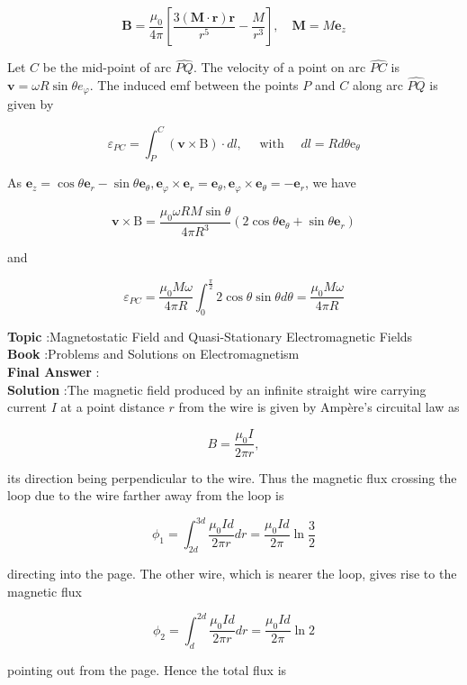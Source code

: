 \documentclass[10pt]{article}
\begin{document}
$$
\mathbf{B}=\frac{\mu_{0}}{4 \pi}\left[\frac{3(\mathbf{M} \cdot \mathbf{r}) \mathbf{r}}{r^{5}}-\frac{M}{r^{3}}\right], \quad \mathbf{M}=M \mathbf{e}_{z}
$$

Let $C$ be the mid-point of arc $\widehat{P Q}$. The velocity of a point on arc $\widehat{P C}$ is $\mathbf{v}=\omega R \sin \theta e_{\varphi}$. The induced emf between the points $P$ and $C$ along arc $\widehat{P Q}$ is given by

$$
\varepsilon_{P C}=\int_{P}^{C}(\mathbf{v} \times \mathrm{B}) \cdot d l, \quad \text { with } \quad d l=R d \theta \mathrm{e}_{\theta}
$$

As $\mathbf{e}_{z}=\cos \theta \mathbf{e}_{r}-\sin \theta \mathbf{e}_{\theta}, \mathbf{e}_{\varphi} \times \mathbf{e}_{r}=\mathbf{e}_{\theta}, \mathbf{e}_{\varphi} \times \mathbf{e}_{\theta}=-\mathbf{e}_{r}$, we have

$$
\mathbf{v} \times \mathrm{B}=\frac{\mu_{0} \omega R M \sin \theta}{4 \pi R^{3}}\left(2 \cos \theta \mathbf{e}_{\theta}+\sin \theta \mathbf{e}_{r}\right)
$$

and

$$
\varepsilon_{P C}=\frac{\mu_{0} M \omega}{4 \pi R} \int_{0}^{\frac{\pi}{2}} 2 \cos \theta \sin \theta d \theta=\frac{\mu_{0} M \omega}{4 \pi R}
$$

\textbf{Topic} :Magnetostatic Field and Quasi-Stationary Electromagnetic Fields\\
\textbf{Book} :Problems and Solutions on Electromagnetism\\
\textbf{Final Answer} :\\


\textbf{Solution} :The magnetic field produced by an infinite straight wire carrying current $I$ at a point distance $r$ from the wire is given by Ampère's circuital law as

$$
B=\frac{\mu_{0} I}{2 \pi r},
$$

its direction being perpendicular to the wire. Thus the magnetic flux crossing the loop due to the wire farther away from the loop is

$$
\phi_{1}=\int_{2 d}^{3 d} \frac{\mu_{0} I d}{2 \pi r} d r=\frac{\mu_{0} I d}{2 \pi} \ln \frac{3}{2}
$$

directing into the page. The other wire, which is nearer the loop, gives rise to the magnetic flux

$$
\phi_{2}=\int_{d}^{2 d} \frac{\mu_{0} I d}{2 \pi r} d r=\frac{\mu_{0} I d}{2 \pi} \ln 2
$$

pointing out from the page. Hence the total flux is
\end{document}
